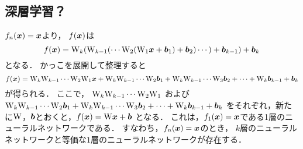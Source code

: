   \subsection{深層学習？}
    $f_n(\boldsymbol{x}) = \boldsymbol{x}$より，
    $f(\boldsymbol{x})$は
    \begin{equation}
      f(\boldsymbol{x}) = \mathrm{W}_k (\mathrm{W}_{k-1} (\cdots \mathrm{W}_2 (\mathrm{W}_1 \boldsymbol{x} + \boldsymbol{b}_1) + \boldsymbol{b}_2) \cdots) + \boldsymbol{b}_{k-1}) + \boldsymbol{b}_k
    \end{equation}
    となる．
    かっこを展開して整理すると
    \begin{equation}
      f(\boldsymbol{x}) = \mathrm{W}_k \mathrm{W}_{k-1} \cdots \mathrm{W}_2 \mathrm{W}_1 \boldsymbol{x} + \mathrm{W}_k \mathrm{W}_{k-1} \cdots \mathrm{W}_2 \boldsymbol{b}_1 + \mathrm{W}_k \mathrm{W}_{k-1} \cdots \mathrm{W}_3 \boldsymbol{b}_2 + \cdots + \mathrm{W}_k \boldsymbol{b}_{k-1} + \boldsymbol{b}_k
    \end{equation}
    が得られる．
    ここで，
    $\mathrm{W}_k \mathrm{W}_{k-1} \cdots \mathrm{W}_2 \mathrm{W}_1$
    および
    $\mathrm{W}_k \mathrm{W}_{k-1} \cdots \mathrm{W}_2 \boldsymbol{b}_1 + \mathrm{W}_k \mathrm{W}_{k-1} \cdots \mathrm{W}_3 \boldsymbol{b}_2 + \cdots + \mathrm{W}_k \boldsymbol{b}_{k-1} + \boldsymbol{b}_k$
    をそれぞれ，新たに$\mathrm{W}$，$\boldsymbol{b}$とおくと，$f(\boldsymbol{x}) = \mathrm{W} \boldsymbol{x} + \boldsymbol{b}$
    となる．
    これは，$f_1(\boldsymbol{x}) = \boldsymbol{x}$である1層のニューラルネットワークである．
    すなわち，$f_n(\boldsymbol{x}) = \boldsymbol{x}$のとき，
    $k$層のニューラルネットワークと等価な$1$層のニューラルネットワークが存在する．


